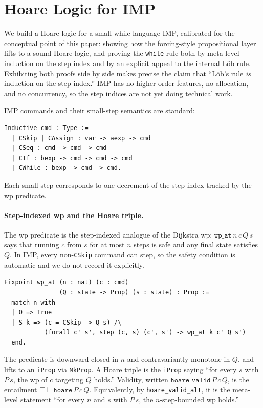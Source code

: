 \section{Hoare Logic for IMP}
\label{sec:imp}

We build a Hoare logic for a small while-language IMP, calibrated for
the conceptual point of this paper: showing how the forcing-style
propositional layer lifts to a sound Hoare logic, and proving the
\texttt{while} rule both by meta-level induction on the step index
and by an explicit appeal to the internal Löb rule.  Exhibiting both
proofs side by side makes precise the claim that ``Löb's rule
\emph{is} induction on the step index.''  IMP has no higher-order
features, no allocation, and no concurrency, so the step indices are
not yet doing technical work.

IMP commands and their small-step semantics are standard:
\begin{lstlisting}
Inductive cmd : Type :=
  | CSkip | CAssign : var -> aexp -> cmd
  | CSeq : cmd -> cmd -> cmd
  | CIf : bexp -> cmd -> cmd -> cmd
  | CWhile : bexp -> cmd -> cmd.
\end{lstlisting}
\noindent
Each small step corresponds to one decrement of the step index
tracked by the wp predicate.

\paragraph{Step-indexed wp and the Hoare triple.}
The wp predicate is the step-indexed analogue of the Dijkstra wp:
$\mathtt{wp\_at}\, n\, c\, Q\, s$ says that running $c$ from $s$ for at
most $n$ steps is safe and any final state satisfies $Q$.  In IMP,
every non-\texttt{CSkip} command can step, so the safety condition is
automatic and we do not record it explicitly.
\begin{lstlisting}
Fixpoint wp_at (n : nat) (c : cmd)
               (Q : state -> Prop) (s : state) : Prop :=
  match n with
  | O => True
  | S k => (c = CSkip -> Q s) /\
           (forall c' s', step (c, s) (c', s') -> wp_at k c' Q s')
  end.
\end{lstlisting}
\noindent
The predicate is downward-closed in $n$ and contravariantly monotone
in $Q$, and lifts to an \texttt{iProp} via \texttt{MkProp}.  A Hoare
triple is the \texttt{iProp} saying ``for every $s$ with $P\, s$, the
wp of $c$ targeting $Q$ holds.''  Validity, written
$\mathtt{hoare\_valid}\, P\, c\, Q$, is the entailment
$\top \vdash \mathtt{hoare}\, P\, c\, Q$. Equivalently, by
\texttt{hoare\_valid\_alt}, it is the meta-level statement ``for every
$n$ and $s$ with $P\, s$, the $n$-step-bounded wp holds.''

